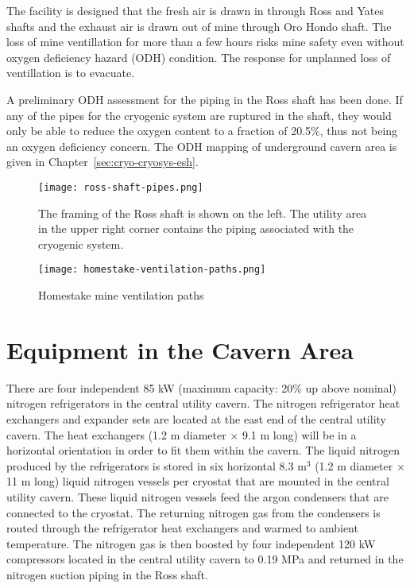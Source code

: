 The facility is designed that the fresh air is drawn
in through Ross and Yates shafts
and the exhaust
air is drawn out of mine through Oro Hondo shaft.
The loss of mine ventillation for more than a few hours risks mine safety
even without oxygen deficiency hazard (ODH) condition.
The response for unplanned loss of ventillation is to evacuate.

A preliminary ODH assessment for 
the piping in the Ross shaft has been done. If any of the pipes
for the cryogenic system are ruptured in the shaft, they would
only be able to reduce the oxygen content to a fraction of 20.5\%, 
thus not being an oxygen deficiency concern. The ODH mapping
of underground cavern area is given in Chapter~\ref{sec:cryo-cryosys-esh}.

\begin{figure}[htbp]
\centering
\texttt{[image: ross-shaft-pipes.png]} 
\caption{The framing of the Ross shaft is shown on the left. The utility area in the upper
right corner contains the piping
associated with the cryogenic system.}
\label{fig:framing-at-ross-piping}
\end{figure}

\begin{figure}[htbp]
\centering
\texttt{[image: homestake-ventilation-paths.png]} 
\caption{Homestake mine ventilation paths}
\label{fig:ventilation-paths}
\end{figure}

\chapter{Equipment in the Cavern Area}
\label{sec:cryo-cryosys-equip-cavern}

There are four independent 85 kW (maximum capacity: 20\% up above nominal) 
nitrogen refrigerators in the central utility cavern. The nitrogen
refrigerator heat exchangers and expander sets are located 
at the east end of the central utility cavern.
The heat exchangers (1.2 m diameter $\times$ 9.1 m long) 
will be in a horizontal orientation in order to
fit them within the cavern. The liquid nitrogen produced 
by the refrigerators is stored in six horizontal 
8.3 m$^3$ (1.2 m diameter $\times$ 11 m long) liquid 
nitrogen vessels per cryostat that are mounted in the
central utility cavern. These liquid nitrogen vessels
feed the argon condensers that are connected 
to the cryostat. The returning nitrogen gas from the 
condensers is routed through the refrigerator heat 
exchangers and warmed to ambient temperature. The 
nitrogen gas is then boosted by four independent 120 kW 
compressors located in the central utility cavern to 0.19 MPa 
and returned in the nitrogen suction piping 
in the Ross shaft.

